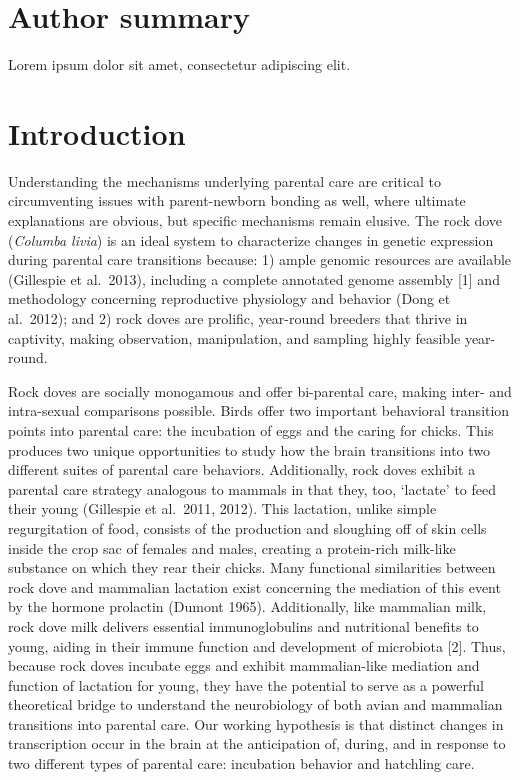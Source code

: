 \documentclass[10pt,letterpaper]{article}
\begin{document}
\section*{Author summary}
Lorem ipsum dolor sit amet, consectetur adipiscing elit.

\linenumbers

\hypertarget{introduction}{%
\section{Introduction}\label{introduction}}

Understanding the mechanisms underlying parental care are critical to
circumventing issues with parent-newborn bonding as well, where ultimate
explanations are obvious, but specific mechanisms remain elusive. The
rock dove (\emph{Columba livia}) is an ideal system to characterize
changes in genetic expression during parental care transitions because:
1) ample genomic resources are available (Gillespie et al.~2013),
including a complete annotated genome assembly {[}1{]} and methodology
concerning reproductive physiology and behavior (Dong et al.~2012); and
2) rock doves are prolific, year-round breeders that thrive in
captivity, making observation, manipulation, and sampling highly
feasible year-round.

Rock doves are socially monogamous and offer bi-parental care, making
inter- and intra-sexual comparisons possible. Birds offer two important
behavioral transition points into parental care: the incubation of eggs
and the caring for chicks. This produces two unique opportunities to
study how the brain transitions into two different suites of parental
care behaviors. Additionally, rock doves exhibit a parental care
strategy analogous to mammals in that they, too, `lactate' to feed their
young (Gillespie et al.~2011, 2012). This lactation, unlike simple
regurgitation of food, consists of the production and sloughing off of
skin cells inside the crop sac of females and males, creating a
protein-rich milk-like substance on which they rear their chicks. Many
functional similarities between rock dove and mammalian lactation exist
concerning the mediation of this event by the hormone prolactin (Dumont
1965). Additionally, like mammalian milk, rock dove milk delivers
essential immunoglobulins and nutritional benefits to young, aiding in
their immune function and development of microbiota {[}2{]}. Thus,
because rock doves incubate eggs and exhibit mammalian-like mediation
and function of lactation for young, they have the potential to serve as
a powerful theoretical bridge to understand the neurobiology of both
avian and mammalian transitions into parental care. Our working
hypothesis is that distinct changes in transcription occur in the brain
at the anticipation of, during, and in response to two different types
of parental care: incubation behavior and hatchling care.
\end{document}
